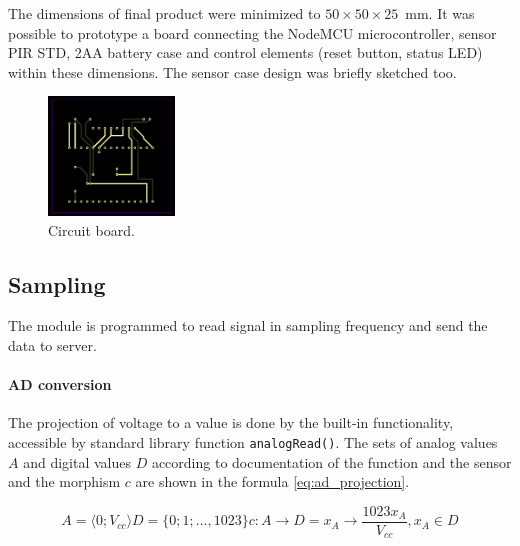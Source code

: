 The dimensions of final product were minimized to $50 \times 50 \times 25$~mm.
It was possible to prototype a board connecting the NodeMCU microcontroller,
sensor PIR STD, 2AA battery case and control elements (reset button, status LED)
within these dimensions. The sensor case design was briefly sketched too.

\begin{figure}[!ht]
\begin{center}
\includegraphics[width=0.3\textwidth]{render/circuitboard.png}
\caption{Circuit board. \label{fig:circuitboard}}
\end{center}
\end{figure}


\subsection*{Sampling}
The module is programmed to read signal in sampling frequency and send the data to server.

\paragraph{AD conversion}
The projection of voltage to a value is done by the built-in functionality, accessible by
standard library function \texttt{analogRead()}. The sets of analog values $A$ and digital values $D$
according to documentation of the function\cite{ArduinoAnalogRead} and the sensor\cite{PIROperationalManual}
and the morphism $c$ are shown in the formula \ref{eq:ad_projection}.

\begin{subequations}
\begin{equation}
A = \langle 0;V_{cc}\rangle
\end{equation}
\begin{equation}
D = \{0; 1; ..., 1023\}
\end{equation}
\begin{equation}
c: A \rightarrow D = x_A \rightarrow \frac{1023x_A}{V_{cc}}, x_A \in D
\end{equation}
\label{eq:ad_projection}
\end{subequations}

